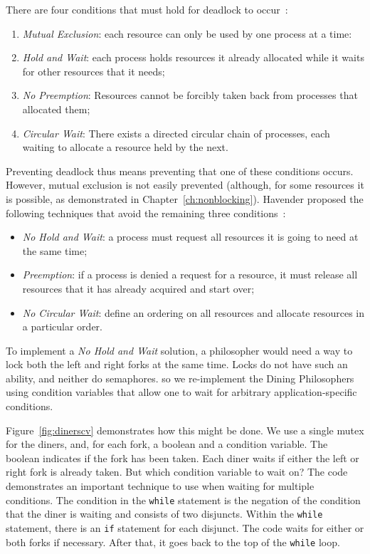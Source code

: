 \documentclass{report}
\begin{document}
\noindent
There are four conditions that must hold for deadlock to occur~\cite{CES71}:
\begin{enumerate}
\item \emph{Mutual Exclusion}: each resource can only be used by one process at a time:
\item \emph{Hold and Wait}: each process holds resources it already allocated while it
waits for other resources that it needs;
\item \emph{No Preemption}: Resources cannot be forcibly taken back from processes that
allocated them;
\item \emph{Circular Wait}: There exists a directed circular chain of processes, each waiting
to allocate a resource held by the next.
\end{enumerate}

Preventing deadlock thus means preventing that one of these conditions occurs.
However, mutual exclusion is not easily prevented (although, for some resources it is
possible, as demonstrated in Chapter~\ref{ch:nonblocking}).
Havender proposed the following techniques that avoid the remaining
three conditions~\cite{Havender68}:

\begin{itemize}
\item \emph{No Hold and Wait}: a process must request all resources it is going to
need at the same time;
\item \emph{Preemption}: if a process is denied a request for a resource, it must
release all resources that it has already acquired and start over;
\item \emph{No Circular Wait}: define an ordering on all resources and allocate
resources in a particular order.
\end{itemize}

To implement a \emph{No Hold and Wait} solution, a philosopher would need a
way to lock both the left and right forks at the same time.  Locks do not
have such an ability, and neither do semaphores. so we re-implement the
Dining Philosophers using condition variables that allow one to wait for
arbitrary application-specific conditions.

Figure~\ref{fig:dinerscv} demonstrates how this might be done.
We use a single mutex for the diners, and, for each fork, a boolean
and a condition variable.  The boolean indicates if the fork has been
taken.
Each diner waits if either the left or right fork is already taken.
But which condition variable to wait on?
The code demonstrates an important technique to use when waiting for
multiple conditions.
The condition in the \texttt{while} statement is the negation of the
condition that the diner is waiting and consists of two disjuncts.
Within the \texttt{while} statement,
there is an \texttt{if} statement for each disjunct.
The code waits for either or both forks if necessary.  After that, it goes
back to the top of the \texttt{while} loop.
\end{document}
